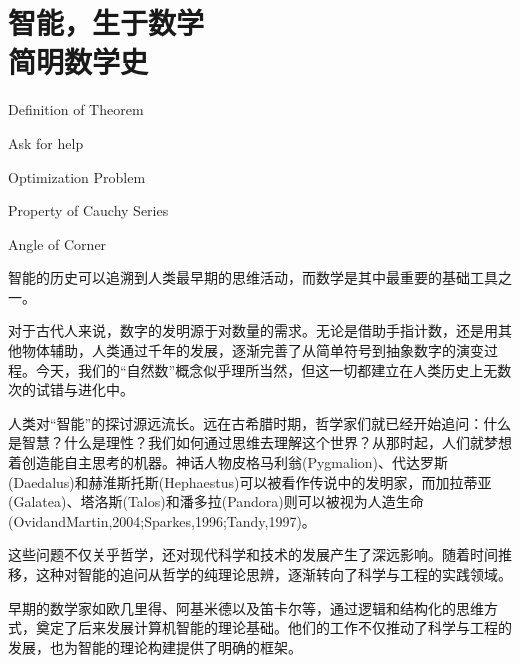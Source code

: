 
\chapter{智能，生于数学 \texorpdfstring{\\}{ }简明数学史}

\begin{introduction}
\item Definition of Theorem
\item Ask for help
\item Optimization Problem
\item Property of Cauchy Series
\item Angle of Corner
\end{introduction}




智能的历史可以追溯到人类最早期的思维活动，而数学是其中最重要的基础工具之一。

对于古代人来说，数字的发明源于对数量的需求。无论是借助手指计数，还是用其他物体辅助，人类通过千年的发展，逐渐完善了从简单符号到抽象数字的演变过程。今天，我们的“自然数”概念似乎理所当然，但这一切都建立在人类历史上无数次的试错与进化中。

人类对“智能”的探讨源远流长。远在古希腊时期，哲学家们就已经开始追问：什么是智慧？什么是理性？我们如何通过思维去理解这个世界？从那时起，人们就梦想着创造能自主思考的机器。神话人物皮格马利翁(Pygmalion)、代达罗斯(Daedalus)和赫淮斯托斯(Hephaestus)可以被看作传说中的发明家，而加拉蒂亚(Galatea)、塔洛斯(Talos)和潘多拉(Pandora)则可以被视为人造生命(OvidandMartin,2004;Sparkes,1996;Tandy,1997)。

这些问题不仅关乎哲学，还对现代科学和技术的发展产生了深远影响。随着时间推移，这种对智能的追问从哲学的纯理论思辨，逐渐转向了科学与工程的实践领域。

早期的数学家如欧几里得、阿基米德以及笛卡尔等，通过逻辑和结构化的思维方式，奠定了后来发展计算机智能的理论基础。他们的工作不仅推动了科学与工程的发展，也为智能的理论构建提供了明确的框架。

